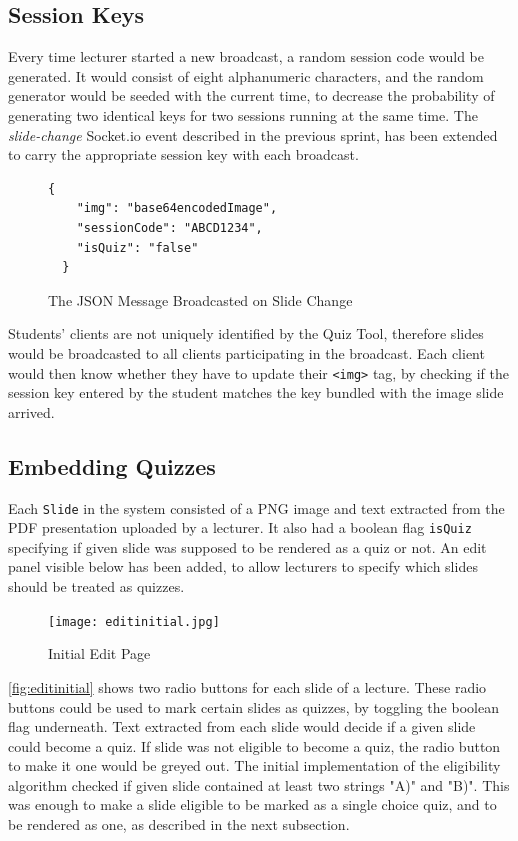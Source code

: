 \subsection{Session Keys}
Every time lecturer started a new broadcast, a random session code would be generated.
It would consist of eight alphanumeric characters, and the random generator would
be seeded with the current time, to decrease the probability of generating two identical
keys for two sessions running at the same time. The \textit{slide-change} Socket.io event
described in the previous sprint, has been extended to carry the appropriate session key
with each broadcast.

\begin{figure}[h!]
  \begin{lstlisting}[basicstyle=\small]
  {
    "img": "base64encodedImage",
    "sessionCode": "ABCD1234",
    "isQuiz": "false"
  }
  \end{lstlisting}
  \caption{The JSON Message Broadcasted on Slide Change}
\end{figure}

Students' clients are not uniquely identified by the Quiz Tool, therefore slides would
be broadcasted to all clients participating in the broadcast. Each client would
then know whether they have to update their \texttt{<img>} tag, by checking
if the session key entered by the student matches the key bundled with the image slide
arrived.

\subsection{Embedding Quizzes}
Each \texttt{Slide} in the system consisted of a PNG image and text extracted
from the PDF presentation uploaded by a lecturer. It also had a boolean flag
\texttt{isQuiz} specifying if given slide was supposed to be rendered as a quiz
or not. An edit panel visible below has been added, to allow lecturers to specify
which slides should be treated as quizzes.

\begin{figure}[h!]
    \centering
    \texttt{[image: editinitial.jpg]}
    \caption{Initial Edit Page}
    \label{fig:editinitial}
\end{figure}

\newpage
\autoref{fig:editinitial} shows two radio buttons for each slide of a lecture.
These radio buttons could be used to mark certain slides as quizzes, by toggling
the boolean flag underneath. Text extracted from each slide would decide if a given
slide could become a quiz. If slide was not eligible to become a quiz, the radio button
to make it one would be greyed out. The initial implementation of the eligibility
algorithm checked if given slide contained at least two strings "A)" and "B)".
This was enough to make a slide eligible to be marked as a single choice quiz, and to be rendered as one,
as described in the next subsection.

